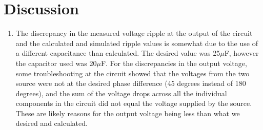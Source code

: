 \documentclass[12pt]{article}
\begin{document}
\section{Discussion}
\begin{enumerate}[label=\alph*.]
    \item %
    The discrepancy in the measured voltage ripple at the output of the circuit and the calculated and simulated ripple values is somewhat due to the use of a different capacitance than calculated. The desired value was 25$\mu$F, however the capacitor used was 20$\mu$F. For the discrepancies in the output voltage, some troubleshooting at the circuit showed that the voltages from the two source were not at the desired phase difference (45 degrees instead of 180 degrees), and the sum of the voltage drops across all the individual components in the circuit did not equal the voltage supplied by the source. These are likely reasons for the output voltage being less than what we desired and calculated.  
\end{enumerate}
\pagebreak
\end{document}
